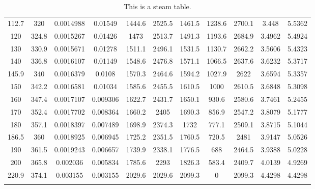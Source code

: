 \begin{longtable}{ccccccccccc}
	112.7   & 320   & 0.0014988 & 0.01549  & 1444.6 & 2525.5 & 1461.5 & 1238.6 & 2700.1 & 3.448  & 5.5362      \\
	120     & 324.8 & 0.0015267 & 0.01426  & 1473   & 2513.7 & 1491.3 & 1193.6 & 2684.9 & 3.4962 & 5.4924      \\
	130     & 330.9 & 0.0015671 & 0.01278  & 1511.1 & 2496.1 & 1531.5 & 1130.7 & 2662.2 & 3.5606 & 5.4323      \\
	140     & 336.8 & 0.0016107 & 0.01149  & 1548.6 & 2476.8 & 1571.1 & 1066.5 & 2637.6 & 3.6232 & 5.3717      \\
	145.9   & 340   & 0.0016379 & 0.0108   & 1570.3 & 2464.6 & 1594.2 & 1027.9 & 2622   & 3.6594 & 5.3357      \\
	150     & 342.2 & 0.0016581 & 0.01034  & 1585.6 & 2455.5 & 1610.5 & 1000   & 2610.5 & 3.6848 & 5.3098      \\
	160     & 347.4 & 0.0017107 & 0.009306 & 1622.7 & 2431.7 & 1650.1 & 930.6  & 2580.6 & 3.7461 & 5.2455      \\
	170     & 352.4 & 0.0017702 & 0.008364 & 1660.2 & 2405   & 1690.3 & 856.9  & 2547.2 & 3.8079 & 5.1777      \\
	180     & 357.1 & 0.0018397 & 0.007489 & 1698.9 & 2374.3 & 1732   & 777.1  & 2509.1 & 3.8715 & 5.1044      \\
	186.5   & 360   & 0.0018925 & 0.006945 & 1725.2 & 2351.5 & 1760.5 & 720.5  & 2481   & 3.9147 & 5.0526      \\
	190     & 361.5 & 0.0019243 & 0.006657 & 1739.9 & 2338.1 & 1776.5 & 688    & 2464.5 & 3.9388 & 5.0228      \\
	200     & 365.8 & 0.002036  & 0.005834 & 1785.6 & 2293   & 1826.3 & 583.4  & 2409.7 & 4.0139 & 4.9269      \\
	220.9   & 374.1 & 0.003155  & 0.003155 & 2029.6 & 2029.6 & 2099.3 & 0      & 2099.3 & 4.4298 & 4.4298      \\
\bottomrule
\caption{This is a steam table.}
\label{table:long}
\end{longtable}
